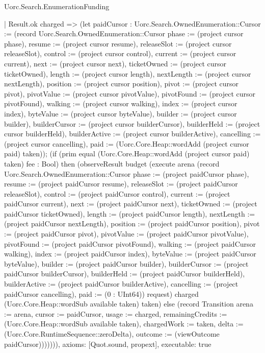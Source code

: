 \begin{lexlean}{Uorc.Search.EnumerationFunding}
\begin{semanticmodule}
{    | Result.ok charged => (let paidCursor : Uorc.Search.OwnedEnumeration::Cursor := (record Uorc.Search.OwnedEnumeration::Cursor {phase := (project cursor phase), resume := (project cursor resume), releaseSlot := (project cursor releaseSlot), control := (project cursor control), current := (project cursor current), next := (project cursor next), ticketOwned := (project cursor ticketOwned), length := (project cursor length), nextLength := (project cursor nextLength), position := (project cursor position), pivot := (project cursor pivot), pivotValue := (project cursor pivotValue), pivotFound := (project cursor pivotFound), walking := (project cursor walking), index := (project cursor index), byteValue := (project cursor byteValue), builder := (project cursor builder), builderCursor := (project cursor builderCursor), builderHeld := (project cursor builderHeld), builderActive := (project cursor builderActive), cancelling := (project cursor cancelling), paid := (Uorc.Core.Heap::wordAdd (project cursor paid) taken)}); (if (prim equal (Uorc.Core.Heap::wordAdd (project cursor paid) taken) fee : Bool) then (observeResult budget (execute arena (record Uorc.Search.OwnedEnumeration::Cursor {phase := (project paidCursor phase), resume := (project paidCursor resume), releaseSlot := (project paidCursor releaseSlot), control := (project paidCursor control), current := (project paidCursor current), next := (project paidCursor next), ticketOwned := (project paidCursor ticketOwned), length := (project paidCursor length), nextLength := (project paidCursor nextLength), position := (project paidCursor position), pivot := (project paidCursor pivot), pivotValue := (project paidCursor pivotValue), pivotFound := (project paidCursor pivotFound), walking := (project paidCursor walking), index := (project paidCursor index), byteValue := (project paidCursor byteValue), builder := (project paidCursor builder), builderCursor := (project paidCursor builderCursor), builderHeld := (project paidCursor builderHeld), builderActive := (project paidCursor builderActive), cancelling := (project paidCursor cancelling), paid := (0 : UInt64)}) request) charged (Uorc.Core.Heap::wordSub available taken) taken) else (record Transition {arena := arena, cursor := paidCursor, usage := charged, remainingCredits := (Uorc.Core.Heap::wordSub available taken), chargedWork := taken, delta := (Uorc.Core.RuntimeSequence::zeroDelta), outcome := (viewOutcome paidCursor)})))))),
  axioms: [Quot.sound, propext],
  executable: true
}


\end{semanticmodule}
\end{lexlean}
